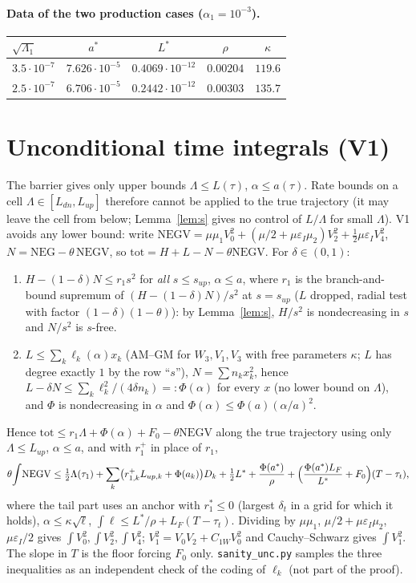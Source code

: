 \documentclass[11pt]{article}
\theoremstyle{definition}
\newcommand{\Ly}{\Lambda}
\newcommand{\tot}{\mathrm{tot}}
\begin{document}
\paragraph{Data of the two production cases ($\alpha_1=10^{-3}$).}
\begin{center}\begin{tabular}{lcccc}\toprule
$\sqrt{\Lambda_1}$ & $a^*$ & $L^*$ & $\rho$ & $\kappa$ \\ \midrule
$3.5\cdot10^{-7}$ & $7.626\cdot10^{-5}$ & $0.4069\cdot10^{-12}$ & $0.00204$ & $119.6$ \\ $2.5\cdot10^{-7}$ & $6.706\cdot10^{-5}$ & $0.2442\cdot10^{-12}$ & $0.00303$ & $135.7$ \\ \bottomrule\end{tabular}\end{center}

\section{Unconditional time integrals (V1)}
The barrier gives only upper bounds $\Ly\le L(\tau)$, $\alpha\le a(\tau)$. Rate bounds on a cell $\Ly\in[L_{dn},L_{up}]$ therefore cannot be applied to the true trajectory (it may leave the cell from below; Lemma~\ref{lem:s} gives no control of $L/\Ly$ for small $\Ly$). V1 avoids any lower bound:
write $\mathrm{NEGV}=\mu\mu_1V_0^2+(\mu/2+\mu\varepsilon_I\mu_2)V_2^2+\tfrac12\mu\varepsilon_IV_4^2$, $N=\mathrm{NEG}-\theta\,\mathrm{NEGV}$, so $\tot=H+L-N-\theta\mathrm{NEGV}$. For $\delta\in(0,1)$:
\begin{enumerate}
\item $H-(1-\delta)N\le r_1s^2$ for \emph{all} $s\le s_{up}$, $\alpha\le a$, where $r_1$ is the branch-and-bound supremum of $(H-(1-\delta)N)/s^2$ at $s=s_{up}$ ($L$ dropped, radial test with factor $(1-\delta)(1-\theta)$): by Lemma~\ref{lem:s}, $H/s^2$ is nondecreasing in $s$ and $N/s^2$ is $s$-free.
\item $L\le\sum_k\ell_k(\alpha)x_k$ (AM--GM for $W_3,V_1,V_3$ with free parameters $\kappa$; $L$ has degree exactly $1$ by the row ``$s$''), $N=\sum n_kx_k^2$, hence $L-\delta N\le\sum_k\ell_k^2/(4\delta n_k)=:\Phi(\alpha)$ for every $x$ (no lower bound on $\Ly$), and $\Phi$ is nondecreasing in $\alpha$ and $\Phi(\alpha)\le\Phi(a)(\alpha/a)^2$.
\end{enumerate}
Hence $\tot\le r_1\Ly+\Phi(\alpha)+F_0-\theta\mathrm{NEGV}$ along the true trajectory using only $\Ly\le L_{up}$, $\alpha\le a$, and with $r_1^+$ in place of $r_1$,
\[\theta\!\int\!\mathrm{NEGV}\le\tfrac12\Ly(\tau_1)+\sum_k\bigl(r_{1,k}^+L_{up,k}+\Phi(a_k)\bigr)D_k+\tfrac12L^*+\frac{\Phi(a^*)}{\rho}+\Bigl(\frac{\Phi(a^*)L_F}{L^*}+F_0\Bigr)(T-\tau_t),\]
where the tail part uses an anchor with $r_1^*\le0$ (largest $\delta_t$ in a grid for which it holds), $\alpha\le\kappa\sqrt\ell$, $\int\ell\le L^*/\rho+L_F(T-\tau_t)$. Dividing by $\mu\mu_1$, $\mu/2+\mu\varepsilon_I\mu_2$, $\mu\varepsilon_I/2$ gives $\int V_0^2,\int V_2^2,\int V_4^2$; $V_1^2=V_0V_2+C_{1W}V_0^2$ and Cauchy--Schwarz gives $\int V_1^2$. The slope in $T$ is the floor forcing $F_0$ only.
\texttt{sanity\_unc.py} samples the three inequalities as an independent check of the coding of $\ell_k$ (not part of the proof).
\end{document}
